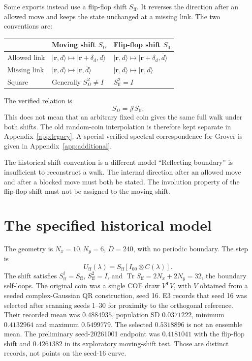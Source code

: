 \documentclass[11pt,a4paper,oneside]{report}
\newcommand{\ket}[1]{\lvert #1\rangle}
\newcommand{\Id}{I}
\newcommand{\Tr}{\operatorname{Tr}}
\numberwithin{equation}{chapter}
\begin{document}
Some exports instead use a flip-flop shift \(S_{\mathrm{ff}}\).
It reverses the direction after an allowed move and keeps the state
unchanged at a missing link. The two conventions are:
\begin{center}
\small
\begin{tabularx}{\textwidth}{@{}lYY@{}}
\toprule
& Moving shift \(S_\Omega\)&Flip-flop shift \(S_{\mathrm{ff}}\)\\
\midrule
Allowed link&\(\ket{\mathbf r,d}\mapsto\ket{\mathbf r+\delta_d,d}\)
&\(\ket{\mathbf r,d}\mapsto\ket{\mathbf r+\delta_d,\bar d}\)\\
Missing link&\(\ket{\mathbf r,d}\mapsto\ket{\mathbf r,\bar d}\)
&\(\ket{\mathbf r,d}\mapsto\ket{\mathbf r,d}\)\\
Square&Generally \(S_\Omega^2\neq\Id\)&\(S_{\mathrm{ff}}^2=\Id\)\\
\bottomrule
\end{tabularx}
\end{center}
The verified relation is
\begin{equation}
S_\Omega=\mathcal J S_{\mathrm{ff}}.
\end{equation}
This does not mean that an arbitrary fixed coin gives the same full
walk under both shifts. The old random-coin interpolation is therefore
kept separate in Appendix~\ref{app:legacy}. A special verified spectral
correspondence for Grover is given in Appendix~\ref{app:additional}.

\begin{lesson}{The historical shift convention is a different model}
``Reflecting boundary'' is insufficient to reconstruct a walk.
The internal direction after an allowed move and after a blocked move
must both be stated. The involution property of the flip-flop shift
must not be assigned to the moving shift.
\end{lesson}



\section{The specified historical model}

The geometry is \(N_x=10,N_y=6\), \(D=240\), with no periodic
boundary. The step is
\begin{equation}
U_{\mathrm{ff}}(\lambda)=S_{\mathrm{ff}}
[\Id_{60}\otimes C(\lambda)].
\end{equation}
The shift satisfies \(S_{\mathrm{ff}}^\dagger=S_{\mathrm{ff}}\),
\(S_{\mathrm{ff}}^2=\Id\), and
\(\Tr S_{\mathrm{ff}}=2N_x+2N_y=32\), the boundary self-loops.
The original coin was a single COE draw \(V^{\mathsf T}V\), with
\(V\) obtained from a seeded complex-Gaussian QR construction,
seed 16. E3 records that seed 16 was selected after scanning seeds
1--30 for proximity to the orthogonal reference. Their recorded mean
was \(0.4884935\), population SD \(0.0371222\), minimum \(0.4132964\)
and maximum \(0.5499779\). The selected \(0.5318896\) is not an
ensemble mean. The preliminary seed-20261001 endpoint was \(0.4181041\)
with the flip-flop shift and \(0.4261382\) in its exploratory
moving-shift test. Those are distinct records, not points on the
seed-16 curve.
\end{document}
